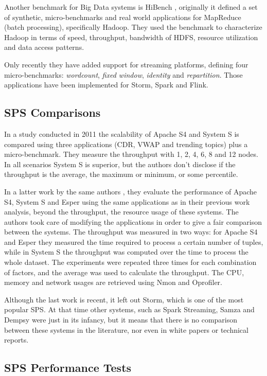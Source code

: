 \documentclass[ppgc,diss,english]{iiufrgs}
\begin{document}
Another benchmark for Big Data systems is HiBench \cite{huang2010hibench}, originally it defined a set of synthetic, micro-benchmarks and real world applications for MapReduce (batch processing), specifically Hadoop. They used the benchmark to characterize Hadoop in terms of speed, throughput, bandwidth of HDFS, resource utilization and data access patterns.

Only recently they have added support for streaming platforms, defining four micro-benchmarks: \textit{wordcount}, \textit{fixed window}, \textit{identity} and \textit{repartition}. Those applications have been implemented for Storm, Spark and Flink.


\subsection{SPS Comparisons}

In a study conducted in 2011 \cite{dayarathna2011performance} the scalability of Apache S4 and System S is compared using three applications (CDR, VWAP and trending topics) plus a micro-benchmark. They measure the throughput with 1, 2, 4, 6, 8 and 12 nodes. In all scenarios System S is superior, but the authors don't disclose if the throughput is the average, the maximum or minimum, or some percentile.

In a latter work by the same authors \cite{dayarathna2013performance}, they evaluate the performance of Apache S4, System S and Esper using the same applications as in their previous work analysis, beyond the throughput, the resource usage of these systems. The authors took care of modifying the applications in order to give a fair comparison between the systems. The throughput was measured in two ways: for Apache S4 and Esper they measured the time required to process a certain number of tuples, while in System S the throughput was computed over the time to process the whole dataset. The experiments were repeated three times for each combination of factors, and the average was used to calculate the throughput. The CPU, memory and network usages are retrieved using Nmon and Oprofiler.

Although the last work is recent, it left out Storm, which is one of the most popular SPS. At that time other systems, such as Spark Streaming, Samza and Dempsy were just in its infancy, but it means that there is no comparison between these systems in the literature, nor even in white papers or technical reports.

\subsection{SPS Performance Tests}
\end{document}
